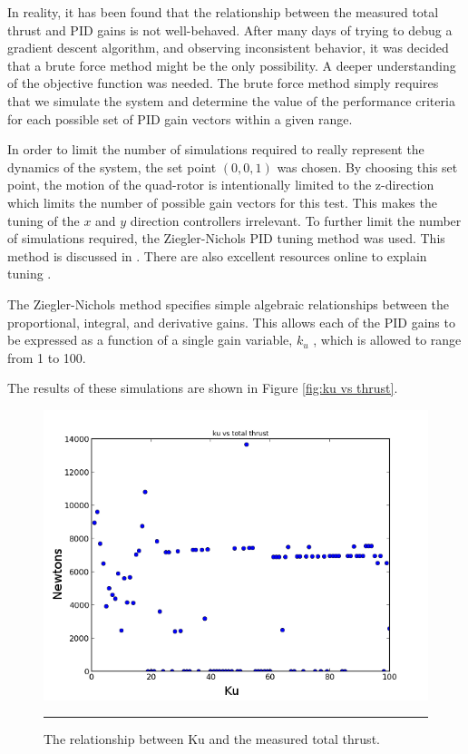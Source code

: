 In reality, it has been found that the relationship between the measured total thrust and PID gains is not well-behaved. After many days of trying to debug a gradient descent algorithm, and observing inconsistent behavior, it was decided that a brute force method might be the only possibility. A deeper understanding of the objective function was needed. The brute force method simply requires that we simulate the system and determine the value of the performance criteria for each possible set of PID gain vectors within a given range.

In order to limit the number of simulations required to really represent the dynamics of the system, the set point $(0,0,1)$ was chosen. By choosing this set point, the motion of the quad-rotor is intentionally limited to the z-direction which limits the number of possible gain vectors for this test. This makes the tuning of the $x$ and $y$ direction controllers irrelevant. To further limit the number of simulations required, the Ziegler-Nichols PID tuning method was used. This method is discussed in \cite{ziegler1942optimum}. There are also excellent resources online to explain tuning \cite{znw:2014:Online}.

The Ziegler-Nichols method specifies simple algebraic relationships between the proportional, integral, and derivative gains. This allows each of the PID gains to be expressed as a function of a single gain variable, $k_u$ , which is allowed to range from 1 to 100.




 The results of these simulations are shown in Figure \ref{fig:ku vs thrust}.


\begin{figure}[htbp]
	\centering
		\includegraphics{Figures/kuvsthrust.png}
		\rule{35em}{0.5pt}
	\caption[Ku vs Thrust]{The relationship between Ku and the measured total thrust.}
	\label{fig:Ku vs Thrust}
\end{figure}

